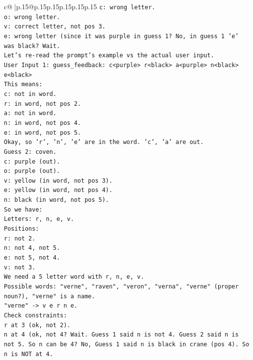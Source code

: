 \documentclass{article}
\begin{document}
{\begin{supertabular}{c@{$\;$}|p{.15\linewidth}@{}p{.15\linewidth}p{.15\linewidth}p{.15\linewidth}p{.15\linewidth}p{.15\linewidth}}
{{{\texttt{c: wrong letter.} \\
\texttt{o: wrong letter.} \\
\texttt{v: correct letter, not pos 3.} \\
\texttt{e: wrong letter (since it was purple in guess 1? No, in guess 1 'e' was black? Wait.} \\
\texttt{Let's re{-}read the prompt's example vs the actual user input.} \\
\texttt{User Input 1: guess\_feedback: c<purple> r<black> a<purple> n<black> e<black>} \\
\texttt{This means:} \\
\texttt{c: not in word.} \\
\texttt{r: in word, not pos 2.} \\
\texttt{a: not in word.} \\
\texttt{n: in word, not pos 4.} \\
\texttt{e: in word, not pos 5.} \\
\texttt{Okay, so 'r', 'n', 'e' are in the word. 'c', 'a' are out.} \\
\texttt{Guess 2: coven.} \\
\texttt{c: purple (out).} \\
\texttt{o: purple (out).} \\
\texttt{v: yellow (in word, not pos 3).} \\
\texttt{e: yellow (in word, not pos 4).} \\
\texttt{n: black (in word, not pos 5).} \\
\texttt{So we have:} \\
\texttt{Letters: r, n, e, v.} \\
\texttt{Positions:} \\
\texttt{r: not 2.} \\
\texttt{n: not 4, not 5.} \\
\texttt{e: not 5, not 4.} \\
\texttt{v: not 3.} \\
\texttt{We need a 5 letter word with r, n, e, v.} \\
\texttt{Possible words: "verne", "raven", "veron", "verna", "verne" (proper noun?), "verne" is a name.} \\
\texttt{"verne" {-}> v e r n e.} \\
\texttt{Check constraints:} \\
\texttt{r at 3 (ok, not 2).} \\
\texttt{n at 4 (ok, not 4? Wait. Guess 1 said n is not 4. Guess 2 said n is not 5. So n can be 4? No, Guess 1 said n is black in crane (pos 4). So n is NOT at 4.} \\
}}}
\end{supertabular}}
\end{document}
